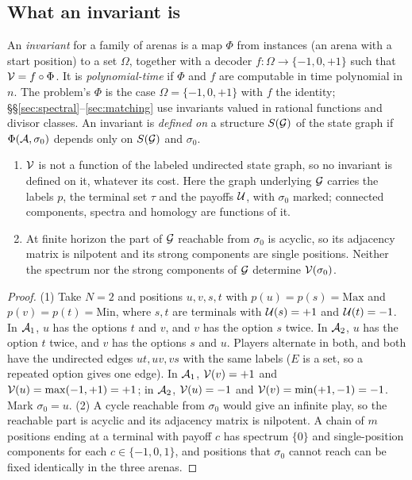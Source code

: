 \subsection{What an invariant is}
\begin{definition*}
An \emph{invariant} for a family of arenas is a map $\Phi$ from instances (an arena with a start position) to a set $\Omega$, together with a decoder $f\colon\Omega\to\{-1,0,+1\}$ such that $\mathcal{V}=f\circ\Phi$. It is \emph{polynomial-time} if $\Phi$ and $f$ are computable in time polynomial in $n$. The problem's $\Phi$ is the case $\Omega=\{-1,0,+1\}$ with $f$ the identity; \S\S\ref{sec:spectral}--\ref{sec:matching} use invariants valued in rational functions and divisor classes. An invariant is \emph{defined on} a structure $S(\mathcal{G})$ of the state graph if $\Phi(\mathcal{A},\sigma_0)$ depends only on $S(\mathcal{G})$ and $\sigma_0$.
\end{definition*}

\begin{proposition}\label{prop:blind}
\begin{enumerate}[label=\textup{(\arabic*)}]
\item $\mathcal{V}$ is not a function of the labeled undirected state graph, so no invariant is defined on it, whatever its cost. Here the graph underlying $\mathcal{G}$ carries the labels $p$, the terminal set $\tau$ and the payoffs $\mathcal{U}$, with $\sigma_0$ marked; connected components, spectra and homology are functions of it.
\item At finite horizon the part of $\mathcal{G}$ reachable from $\sigma_0$ is acyclic, so its adjacency matrix is nilpotent and its strong components are single positions. Neither the spectrum nor the strong components of $\mathcal{G}$ determine $\mathcal{V}(\sigma_0)$.
\end{enumerate}
\end{proposition}

\begin{proof}
(1) Take $N=2$ and positions $u,v,s,t$ with $p(u)=p(s)=\mathrm{Max}$ and $p(v)=p(t)=\mathrm{Min}$, where $s,t$ are terminals with $\mathcal{U}(s)=+1$ and $\mathcal{U}(t)=-1$. In $\mathcal{A}_1$, $u$ has the options $t$ and $v$, and $v$ has the option $s$ twice. In $\mathcal{A}_2$, $u$ has the option $t$ twice, and $v$ has the options $s$ and $u$. Players alternate in both, and both have the undirected edges $ut,uv,vs$ with the same labels ($E$ is a set, so a repeated option gives one edge). In $\mathcal{A}_1$, $\mathcal{V}(v)=+1$ and $\mathcal{V}(u)=\max(-1,+1)=+1$; in $\mathcal{A}_2$, $\mathcal{V}(u)=-1$ and $\mathcal{V}(v)=\min(+1,-1)=-1$. Mark $\sigma_0=u$.
(2) A cycle reachable from $\sigma_0$ would give an infinite play, so the reachable part is acyclic and its adjacency matrix is nilpotent. A chain of $m$ positions ending at a terminal with payoff $c$ has spectrum $\{0\}$ and single-position components for each $c\in\{-1,0,1\}$, and positions that $\sigma_0$ cannot reach can be fixed identically in the three arenas.
\end{proof}

